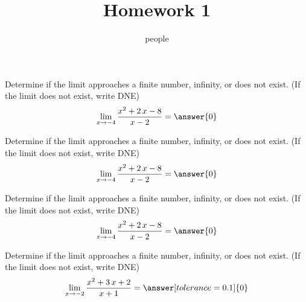 \documentclass[handout]{ximera}
\title{Homework 1}
\author{people}
\begin{document}
\maketitle

\begin{shuffle}  %

\begin{problem}
Determine if the limit approaches a finite number, infinity, or does not exist. (If the limit does not exist, write DNE)
\[\lim_{x\to{{-4}}}\dfrac{{{x^{2} + 2 \, x - 8}}}{{{x - 2}}}=\answer{0}\]
\end{problem}%



\begin{problem}
Determine if the limit approaches a finite number, infinity, or does not exist. (If the limit does not exist, write DNE)
\[\lim_{x\to{{-4}}}\dfrac{{{x^{2} + 2 \, x - 8}}}{{{x - 2}}}=\answer{0}\]
\end{problem}%



\begin{problem}
Determine if the limit approaches a finite number, infinity, or does not exist. (If the limit does not exist, write DNE)
\[\lim_{x\to{{-4}}}\dfrac{{{x^{2} + 2 \, x - 8}}}{{{x - 2}}}=\answer{0}\]
\end{problem}%



\begin{problem}
Determine if the limit approaches a finite number, infinity, or does not exist. (If the limit does not exist, write DNE)
\[\lim_{x\to{{-2}}}\dfrac{{{x^{2} + 3 \, x + 2}}}{{{x + 1}}}=\answer[tolerance=0.1]{0}\]
\end{problem}%


\end{shuffle}

\end{document}
